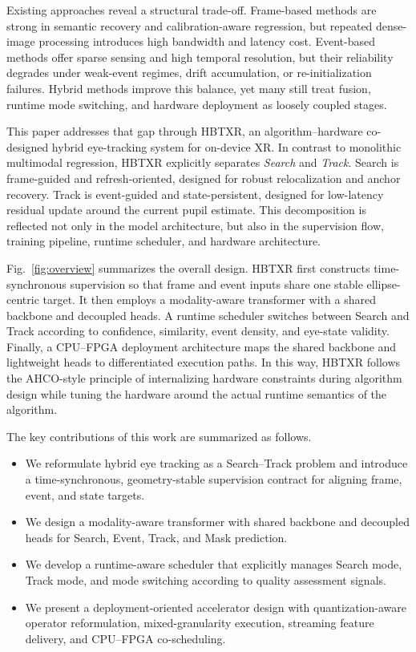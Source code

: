 \documentclass[journal]{IEEEtran}
\begin{document}
Existing approaches reveal a structural trade-off. Frame-based methods are strong in semantic recovery and calibration-aware regression, but repeated dense-image processing introduces high bandwidth and latency cost. Event-based methods offer sparse sensing and high temporal resolution, but their reliability degrades under weak-event regimes, drift accumulation, or re-initialization failures. Hybrid methods improve this balance, yet many still treat fusion, runtime mode switching, and hardware deployment as loosely coupled stages.

This paper addresses that gap through HBTXR, an algorithm--hardware co-designed hybrid eye-tracking system for on-device XR. In contrast to monolithic multimodal regression, HBTXR explicitly separates \emph{Search} and \emph{Track}. Search is frame-guided and refresh-oriented, designed for robust relocalization and anchor recovery. Track is event-guided and state-persistent, designed for low-latency residual update around the current pupil estimate. This decomposition is reflected not only in the model architecture, but also in the supervision flow, training pipeline, runtime scheduler, and hardware architecture.

Fig.~\ref{fig:overview} summarizes the overall design. HBTXR first constructs time-synchronous supervision so that frame and event inputs share one stable ellipse-centric target. It then employs a modality-aware transformer with a shared backbone and decoupled heads. A runtime scheduler switches between Search and Track according to confidence, similarity, event density, and eye-state validity. Finally, a CPU--FPGA deployment architecture maps the shared backbone and lightweight heads to differentiated execution paths. In this way, HBTXR follows the AHCO-style principle of internalizing hardware constraints during algorithm design while tuning the hardware around the actual runtime semantics of the algorithm.

The key contributions of this work are summarized as follows.
\begin{itemize}
    \item We reformulate hybrid eye tracking as a Search--Track problem and introduce a time-synchronous, geometry-stable supervision contract for aligning frame, event, and state targets.
    \item We design a modality-aware transformer with shared backbone and decoupled heads for Search, Event, Track, and Mask prediction.
    \item We develop a runtime-aware scheduler that explicitly manages Search mode, Track mode, and mode switching according to quality assessment signals.
    \item We present a deployment-oriented accelerator design with quantization-aware operator reformulation, mixed-granularity execution, streaming feature delivery, and CPU--FPGA co-scheduling.
\end{itemize}
\end{document}
